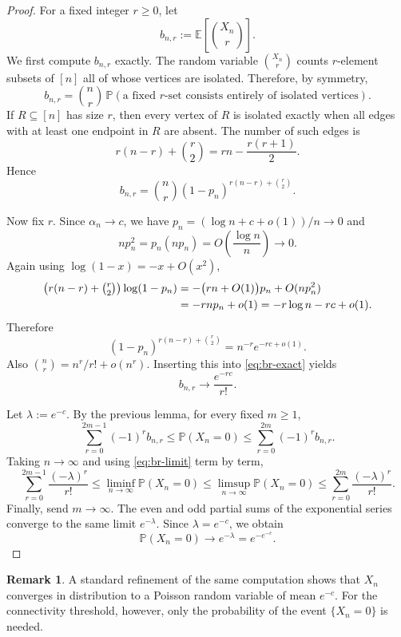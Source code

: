 \documentclass[11pt]{article}
\newcommand{\PP}{\mathbb{P}}
\newcommand{\EE}{\mathbb{E}}
\newcommand{\bbinom}[2]{\binom{#1}{#2}}
\theoremstyle{plain}
\theoremstyle{definition}
\newtheorem{remark}[theorem]{Remark}
\begin{document}
\begin{proof}
For a fixed integer $r\ge 0$, let
\[
b_{n,r} := \EE\!\left[\bbinom{X_n}{r}\right].
\]
We first compute $b_{n,r}$ exactly.  The random variable $\binom{X_n}{r}$ counts $r$-element subsets of $[n]$ all of whose vertices are isolated.  Therefore, by symmetry,
\[
b_{n,r} = \bbinom{n}{r}\,\PP(\text{a fixed }r\text{-set consists entirely of isolated vertices}).
\]
If $R\subseteq[n]$ has size $r$, then every vertex of $R$ is isolated exactly when all edges with at least one endpoint in $R$ are absent.  The number of such edges is
\[
r(n-r)+\bbinom{r}{2} = rn - \frac{r(r+1)}{2}.
\]
Hence
\begin{equation}\label{eq:br-exact}
 b_{n,r} = \bbinom{n}{r}(1-p_n)^{r(n-r)+\binom{r}{2}}.
\end{equation}

Now fix $r$.  Since $\alpha_n\to c$, we have $p_n=(\log n + c + o(1))/n\to 0$ and
\[
n p_n^2 = p_n(np_n) = O\!\left(\frac{\log n}{n}\right)\to 0.
\]
Again using $\log(1-x)=-x+O(x^2)$,
\begin{align*}
\bigl(r(n-r)+\tbinom{r}{2}\bigr)\log(1-p_n)
&= -\bigl(rn+O(1)\bigr)p_n + O(n p_n^2) \\
&= -r n p_n + o(1)
= -r\log n - rc + o(1).
\end{align*}
Therefore
\[
(1-p_n)^{r(n-r)+\binom{r}{2}}
= n^{-r} e^{-rc + o(1)}.
\]
Also $\binom{n}{r}=n^r/r!+o(n^r)$.  Inserting this into \eqref{eq:br-exact} yields
\begin{equation}\label{eq:br-limit}
 b_{n,r} \to \frac{e^{-rc}}{r!}.
\end{equation}

Let $\lambda := e^{-c}$.  By the previous lemma, for every fixed $m\ge 1$,
\[
\sum_{r=0}^{2m-1} (-1)^r b_{n,r}
\le
\PP(X_n=0)
\le
\sum_{r=0}^{2m} (-1)^r b_{n,r}.
\]
Taking $n\to\infty$ and using \eqref{eq:br-limit} term by term,
\[
\sum_{r=0}^{2m-1} \frac{(-\lambda)^r}{r!}
\le
\liminf_{n\to\infty} \PP(X_n=0)
\le
\limsup_{n\to\infty} \PP(X_n=0)
\le
\sum_{r=0}^{2m} \frac{(-\lambda)^r}{r!}.
\]
Finally, send $m\to\infty$.  The even and odd partial sums of the exponential series converge to the same limit $e^{-\lambda}$.  Since $\lambda=e^{-c}$, we obtain
\[
\PP(X_n=0)\to e^{-\lambda}=e^{-e^{-c}}.
\]
\end{proof}

\begin{remark}
A standard refinement of the same computation shows that $X_n$ converges in distribution to a Poisson random variable of mean $e^{-c}$.  For the connectivity threshold, however, only the probability of the event $\{X_n=0\}$ is needed.
\end{remark}
\end{document}
